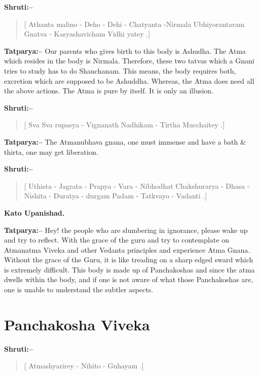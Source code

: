 \textbf{Shruti:–}

\begin{verse}
[ Athanta malino - Deho - Dehi - Chatyanta -\break Nirmala  Ubhiyorantaram Gnatva - Kasyashavicham Vidhi yatey .]
\end{verse}

\textbf{Tatparya:–} Our parents who gives birth to this body is Ashudha. The Atma which resides in the body is Nirmala. Therefore, these two tatvas which a Gnani tries to study has to do Shanchanam. This means, the body requires both, excretion which are supposed to be Ashuddha. Whereas, the Atma does need all the above actions. The Atma is pure by itself. It is only an illusion.

\textbf{Shruti:–}

\begin{verse}
[ Sva Sva rupasya - Vignanath Nadhikam - Tirtha Mucchaitey .]
\end{verse}

\textbf{Tatparya:–} The Atmanubhava gnana, one must immense and have a bath \& thirta, one may get liberation.

\textbf{Shruti:–}

\begin{verse}
[ Uthista - Jagrata - Prapya - Vara - Nibhodhat  Chakshurarya - Dhasa - Nishita - Duratya - durgam Padam - Tatkvayo - Vadanti .]
\end{verse}

\begin{flushright}
\textbf{Kato Upanishad.}
\end{flushright}

\textbf{Tatparya:–} Hey! the people who are slumbering in ignorance, please wake up and try to reflect. With the grace of the guru and try to contemplate on Atmanatma Viveka and other Vedanta principles and experience Atma Gnana. Without the grace of the Guru, it is like treading on a sharp edged sward which is extremely difficult. This body is made up of Panchakoshas and since the atma dwells within the body, and if one is not aware of what those Panchakoshas are, one is unable to understand the subtler aspects.

\chapter{Panchakosha Viveka}

\textbf{Shruti:–}

\begin{verse}
[ Atmashyarirey - Nihito - Guhayam .]
\end{verse}

